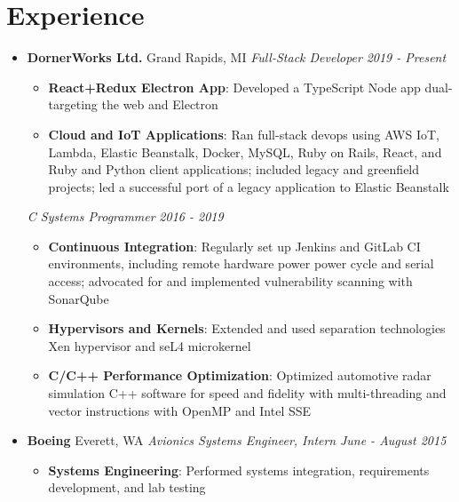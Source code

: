 \documentclass[letterpaper,11pt]{article}
\newcommand{\resumeItem}[2]{
  \item\small{
    \textbf{#1}{: #2 \vspace{-2pt}}
  }
}
\newcommand{\resumeSubheading}[4]{
  \vspace{-1pt}\item
    \textbf{#1} \dotfill #2 \newline
    \textit{\small#3} \hfill \textit{\small #4}
  \vspace{-5pt}
}
\newcommand{\resumeSubheadingII}[2]{
  \vspace{-1pt}
    \textit{\small#1} \hfill \textit{\small #2}
  \vspace{-5pt}
}
\newcommand{\resumeSubHeadingListStart}{\begin{itemize}[leftmargin=*]}
\newcommand{\resumeSubHeadingListEnd}{\end{itemize}}
\newcommand{\resumeItemListStart}{\begin{itemize}}
\newcommand{\resumeItemListEnd}{\end{itemize}\vspace{-5pt}}
\begin{document}
\section{Experience}
  \resumeSubHeadingListStart

    \resumeSubheading
      {DornerWorks Ltd.}{Grand Rapids, MI}
      {Full-Stack Developer}{2019 - Present}
      \resumeItemListStart
        \resumeItem{React+Redux Electron App}
          {Developed a TypeScript Node app dual-targeting the web and Electron}
        \resumeItem{Cloud and IoT Applications}
          {Ran full-stack devops using AWS IoT, Lambda, Elastic Beanstalk, Docker, MySQL, Ruby on Rails, React, and Ruby and Python client applications;
            included legacy and greenfield projects; led a successful port of a legacy application to Elastic Beanstalk}
      \resumeItemListEnd
      \resumeSubheadingII{C Systems Programmer}{2016 - 2019}
      \resumeItemListStart
        \resumeItem{Continuous Integration}
          {Regularly set up Jenkins and GitLab CI environments, including remote hardware power power cycle and serial access;
            advocated for and implemented vulnerability scanning with SonarQube}
        \resumeItem{Hypervisors and Kernels}
          {Extended and used separation technologies Xen hypervisor and seL4 microkernel}
        \resumeItem{C/C++ Performance Optimization}
          {Optimized automotive radar simulation C++ software for speed and fidelity with multi-threading and vector instructions with OpenMP and Intel SSE}
      \resumeItemListEnd

    \resumeSubheading
      {Boeing}{Everett, WA}
      {Avionics Systems Engineer, Intern}{June - August 2015}
      \resumeItemListStart
        \resumeItem{Systems Engineering}
          {Performed systems integration, requirements development, and lab testing}
      \resumeItemListEnd

  \resumeSubHeadingListEnd


\end{document}
